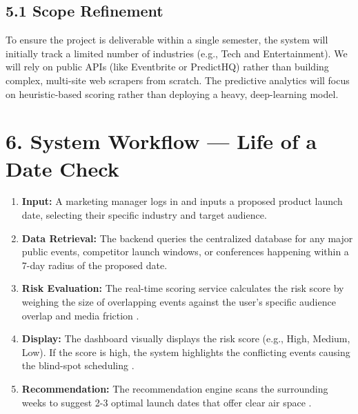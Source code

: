 \documentclass[12pt]{article}
\begin{document}
\subsection*{5.1 Scope Refinement}
To ensure the project is deliverable within a single semester, the system will initially track a limited number of industries (e.g., Tech and Entertainment). We will rely on public APIs (like Eventbrite or PredictHQ) rather than building complex, multi-site web scrapers from scratch. The predictive analytics will focus on heuristic-based scoring rather than deploying a heavy, deep-learning model.

\section*{6. System Workflow — Life of a Date Check}
\begin{enumerate}[leftmargin=*]
    \item \textbf{Input:} A marketing manager logs in and inputs a proposed product launch date, selecting their specific industry and target audience.
    \item \textbf{Data Retrieval:} The backend queries the centralized database for any major public events, competitor launch windows, or conferences happening within a 7-day radius of the proposed date.
    \item \textbf{Risk Evaluation:} The real-time scoring service calculates the risk score by weighing the size of overlapping events against the user's specific audience overlap and media friction .
    \item \textbf{Display:} The dashboard visually displays the risk score (e.g., High, Medium, Low). If the score is high, the system highlights the conflicting events causing the blind-spot scheduling .
    \item \textbf{Recommendation:} The recommendation engine scans the surrounding weeks to suggest 2-3 optimal launch dates that offer clear air space .
\end{enumerate}
\end{document}
